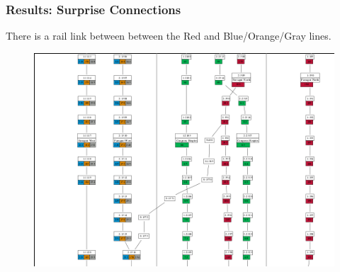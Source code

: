 \documentclass[t]{beamer}
\begin{document}
\begin{frame}
\begin{figure}[!tbp]
\end{figure}

\end{frame}

\begin{frame}
\frametitle{Results: Surprise Connections}

There is a rail link between between the Red and Blue/Orange/Gray lines.
\begin{center}
\begin{figure}
  \includegraphics[scale=0.75]{red_to_blue.png}
\end{figure}
\end{center}

\end{frame}
\end{document}
